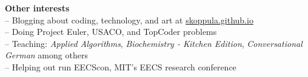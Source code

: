 \documentclass[letterpaper,11pt]{article}
\begin{document}
\vspace{0.1in}
\large \textbf{Other interests\vspace{1mm}} \normalsize \\
\hspace{2mm} -- Blogging about coding, technology, and art at \href{http://www.skoppula.github.io}{skoppula.github.io}\\
\hspace{2mm} -- Doing Project Euler, USACO, and TopCoder problems \\
\hspace{2mm} -- Teaching: \textit{Applied Algorithms}, \textit{Biochemistry - Kitchen Edition}, \textit{Conversational German} among others \\ 
\hspace{2mm} -- Helping out run EECScon, MIT's EECS research conference \\
\end{document}
